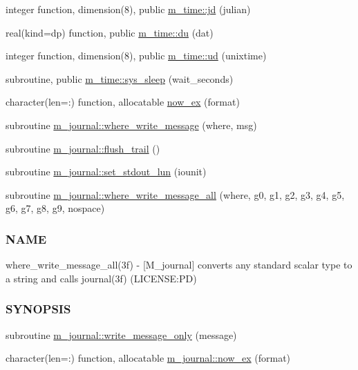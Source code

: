 \begin{DoxyCompactItemize}
\item 
integer function, dimension(8), public \mbox{\hyperlink{namespacem__time_a6c3297c41c6f58f8139c48466a37f292}{m\+\_\+time\+::jd}} (julian)
\item 
real(kind=dp) function, public \mbox{\hyperlink{namespacem__time_af1b675ed3256cd2ac10d461b8f1c7da8}{m\+\_\+time\+::du}} (dat)
\item 
integer function, dimension(8), public \mbox{\hyperlink{namespacem__time_a8b2c0ede467ef5185d478a072a9f969f}{m\+\_\+time\+::ud}} (unixtime)
\item 
subroutine, public \mbox{\hyperlink{namespacem__time_aeb65659c500dd201910f3615858f9b73}{m\+\_\+time\+::sys\+\_\+sleep}} (wait\+\_\+seconds)
\item 
character(len=\+:) function, allocatable \mbox{\hyperlink{M__journal_8f90_a09223e2da0c23850fad035407582fd68}{now\+\_\+ex}} (format)
\item 
subroutine \mbox{\hyperlink{namespacem__journal_a21238c3fc7731703c75eb39233ab529e}{m\+\_\+journal\+::where\+\_\+write\+\_\+message}} (where, msg)
\item 
subroutine \mbox{\hyperlink{namespacem__journal_a24b891eded8ca585a6a72ab0eef7016c}{m\+\_\+journal\+::flush\+\_\+trail}} ()
\item 
subroutine \mbox{\hyperlink{namespacem__journal_a8388800481a5e7ca022b52cfc56b9daf}{m\+\_\+journal\+::set\+\_\+stdout\+\_\+lun}} (iounit)
\item 
subroutine \mbox{\hyperlink{namespacem__journal_a25d0f5da7f7e84e22ab0a583447412b1}{m\+\_\+journal\+::where\+\_\+write\+\_\+message\+\_\+all}} (where, g0, g1, g2, g3, g4, g5, g6, g7, g8, g9, nospace)
\begin{DoxyCompactList}\small\item\em \subsubsection*{N\+A\+ME}

where\+\_\+write\+\_\+message\+\_\+all(3f) -\/ \mbox{[}M\+\_\+journal\mbox{]} converts any standard scalar type to a string and calls journal(3f) (L\+I\+C\+E\+N\+SE\+:PD) \subsubsection*{S\+Y\+N\+O\+P\+S\+IS}\end{DoxyCompactList}\item 
subroutine \mbox{\hyperlink{namespacem__journal_aa86511a7c388f9286c282f6fa933ab58}{m\+\_\+journal\+::write\+\_\+message\+\_\+only}} (message)
\item 
character(len=\+:) function, allocatable \mbox{\hyperlink{namespacem__journal_a9c8074667748f2685122f2b3147e61d5}{m\+\_\+journal\+::now\+\_\+ex}} (format)
\end{DoxyCompactItemize}
